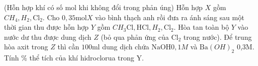 \begin{vd}
	(Hỗn hợp khí có số mol khi không đổi trong phản úng)
	Hỗn hợp $X$ gồm $CH_4, H_2, \mathrm{Cl}_2$. Cho $0,35\mathrm{mol} X$ vào bình thạch anh rồi đưa ra ánh sáng sau một thời gian thu được hỗn hợp $Y$ gồm $CH_3 \mathrm{Cl}, \mathrm{HCl}, H_2, \mathrm{Cl}_2$. Hòa tan toàn bộ $Y$ vào nước dư thu được dung dịch $Z$ (bỏ qua phản ứng của $\mathrm{Cl}_2$ trong nước). Để trung hòa axit trong $Z$ thì cần $100\mathrm{ml}$ dung dịch chứa $\mathrm{NaOH} 0,1M$ và $\mathrm{Ba}(OH)_2$ 0,3M. Tính \% thể tích của khí hidroclorua trong Y.
	\loigiai{
	}
\end{vd}

